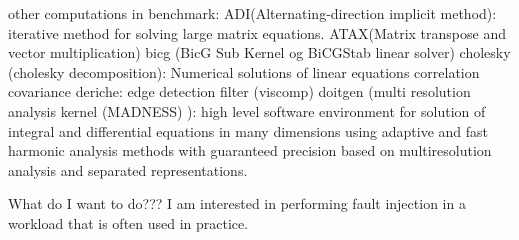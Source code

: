other computations in benchmark:
ADI(Alternating-direction implicit method): iterative method for solving large matrix equations.
ATAX(Matrix transpose and vector multiplication)
bicg (BicG Sub Kernel og BiCGStab linear solver)
cholesky (cholesky decomposition): Numerical solutions of linear equations
correlation
covariance
deriche: edge detection filter (viscomp)
doitgen (multi resolution analysis kernel (MADNESS) ): high level software environment for solution of integral and     differential equations in many dimensions using adaptive and fast harmonic analysis methods with guaranteed
   precision based on multiresolution analysis and separated representations. 


What do I want to do??? I am interested in performing fault injection in a workload that is often used in practice. 
